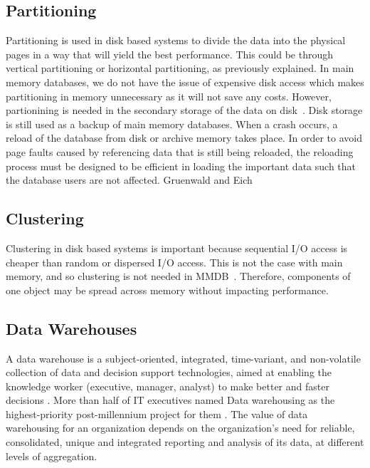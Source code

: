\documentclass[12pt,a4paper]{article}
\begin{document}
\subsection{Partitioning}

Partitioning is used in disk based systems to divide the data into the physical pages in a way that will yield the best performance. This could be through
vertical partitioning or horizontal partitioning, as previously explained. In main memory databases, we do not have the issue of expensive disk access which
makes partitioning in memory unnecessary as it will not save any costs. However, partionining is needed in the secondary storage of the data on
disk~\cite{gruenwald1990database}. Disk storage is still used as a backup of main memory databases. When a crash occurs, a reload of the database from disk or
archive memory takes place. In order to avoid page faults caused by referencing data that is still being reloaded, the reloading process must be designed to be
efficient in loading the important data such that the database users are not affected. Gruenwald and Eich~\cite{gruenwald1990database,gruenwald1990choosing}


\subsection{Clustering}
Clustering in disk based systems is important because sequential I/O access is cheaper than random or dispersed I/O access. This is not the case with main
memory, and so clustering is not needed in MMDB~\cite{garcia1992main, moldovan2008databases}. Therefore, components of one object may be spread across memory
without impacting performance.




\subsection{Data Warehouses}
\label{SEC-WAREHOUSES}
A data warehouse is a subject-oriented, integrated, time-variant, and non-volatile collection of data and decision support technologies, aimed at enabling the knowledge worker (executive, manager, analyst) to make better and faster decisions \cite{560407, 248616}. More than half of IT executives named Data warehousing as the highest-priority post-millennium project for them \cite{sen2005comparison}. The value of data warehousing for an organization depends on the organization's need for reliable, consolidated, unique and integrated reporting and analysis of its data, at different levels of aggregation.
\end{document}
